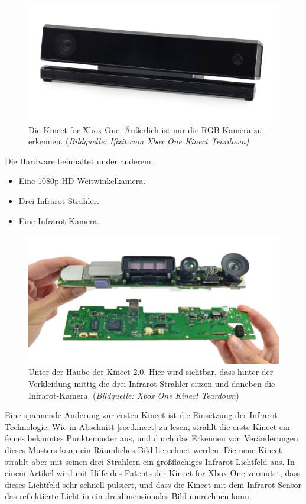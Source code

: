 \documentclass[12pt,a4paper,ngerman]{scrartcl}
\begin{document}
\begin{figure}[H]
    \centering
    \includegraphics[scale=0.31]{img/kinect2.jpg}
    \caption{Die Kinect for Xbox One. Äußerlich ist nur die RGB-Kamera zu erkennen. ({\em Bildquelle: Ifixit.com Xbox One Kinect Teardown\cite{kinect2:teardown})}}
\end{figure}

Die Hardware beinhaltet under anderem:
\begin{itemize}
\item Eine 1080p HD Weitwinkelkamera.\cite{kinect2:teardown}
\item Drei Infrarot-Strahler.\cite{kinect2:infrared}
\item Eine Infrarot-Kamera.\cite{kinect2:teardown}
\end{itemize}

\begin{figure}[H]
    \centering
    \includegraphics[scale=0.7]{img/kinect2_components.jpg}
    \caption{Unter der Haube der Kinect 2.0. Hier wird sichtbar, dass hinter der Verkleidung mittig die drei Infrarot-Strahler sitzen und daneben die Infrarot-Kamera. ({\em Bildquelle: Xbox One Kinect Teardown\cite{kinect2:teardown}})}
\end{figure}

Eine spannende Änderung zur ersten Kinect ist die Einsetzung der Infrarot-Technologie. Wie in Abschnitt \ref{sec:kinect} zu lesen, strahlt die erste Kinect ein feines bekanntes Punktemuster aus, und durch das Erkennen von Veränderungen dieses Musters kann ein Räumliches Bild berechnet werden. Die neue Kinect strahlt aber mit seinen drei Strahlern ein großflächiges Infrarot-Lichtfeld aus. In einem Artikel wird mit Hilfe des Patents der Kinect for Xbox One vermutet, dass dieses Lichtfeld sehr schnell pulsiert, und dass die Kinect mit dem Infrarot-Sensor das reflektierte Licht in ein dreidimensionales Bild umrechnen kann.\cite{kinect2:infrared}
\end{document}
